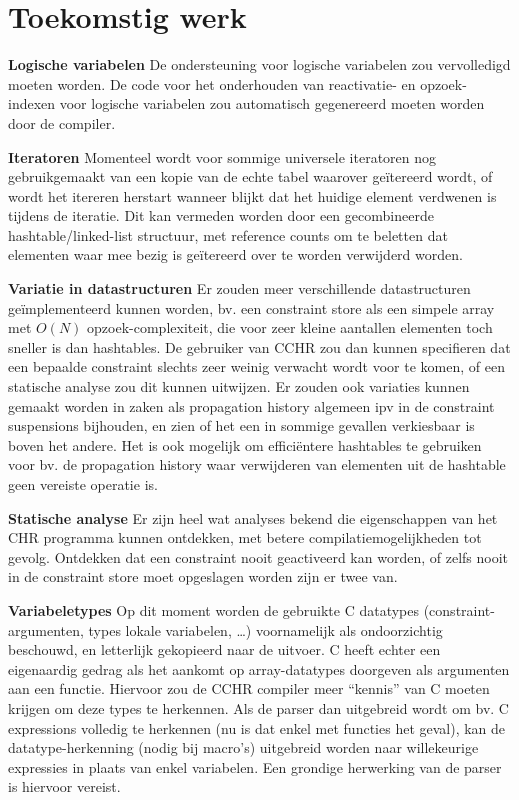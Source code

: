 \section{Toekomstig werk}

{\bf Logische variabelen} De ondersteuning voor logische variabelen zou vervolledigd moeten worden. De code voor het onderhouden van reactivatie- en opzoek-indexen voor logische variabelen zou automatisch gegenereerd moeten worden door de compiler.

{\bf Iteratoren} Momenteel wordt voor sommige universele iteratoren nog gebruikgemaakt van een kopie van de echte tabel waarover ge\"itereerd wordt, of wordt het itereren herstart wanneer blijkt dat het huidige element verdwenen is tijdens de iteratie. Dit kan vermeden worden door een gecombineerde hashtable/linked-list structuur, met reference counts om te beletten dat elementen waar mee bezig is ge\"itereerd over te worden verwijderd worden. 

{\bf Variatie in datastructuren} Er zouden meer verschillende datastructuren ge\"implementeerd kunnen worden, bv. een constraint store als een simpele array met $O(N)$ opzoek-complexiteit, die voor zeer kleine aantallen elementen toch sneller is dan hashtables. De gebruiker van CCHR zou dan kunnen specifieren dat een bepaalde constraint slechts zeer weinig verwacht wordt voor te komen, of een statische analyse zou dit kunnen uitwijzen. Er zouden ook variaties kunnen gemaakt worden in zaken als propagation history algemeen ipv in de constraint suspensions bijhouden, en zien of het een in sommige gevallen verkiesbaar is boven het andere. Het is ook mogelijk om effici\"entere hashtables te gebruiken voor bv. de propagation history waar verwijderen van elementen uit de hashtable geen vereiste operatie is.

{\bf Statische analyse} Er zijn heel wat analyses bekend die eigenschappen van het CHR programma kunnen ontdekken, met betere compilatiemogelijkheden tot gevolg. Ontdekken dat een constraint nooit geactiveerd kan worden, of zelfs nooit in de constraint store moet opgeslagen worden zijn er twee van.

{\bf Variabeletypes} Op dit moment worden de gebruikte C datatypes (constraint-argumenten, types lokale variabelen, \ldots) voornamelijk als ondoorzichtig beschouwd, en letterlijk gekopieerd naar de uitvoer. C heeft echter een eigenaardig gedrag als het aankomt op array-datatypes doorgeven als argumenten aan een functie. Hiervoor zou de CCHR compiler meer ``kennis'' van C moeten krijgen om deze types te herkennen. Als de parser dan uitgebreid wordt om bv. C expressions volledig te herkennen (nu is dat enkel met functies het geval), kan de datatype-herkenning (nodig bij macro's) uitgebreid worden naar willekeurige expressies in plaats van enkel variabelen. Een grondige herwerking van de parser is hiervoor vereist.

